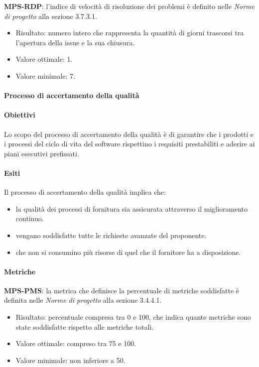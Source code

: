 \documentclass[../piano-di-qualifica.tex]{subfiles}
\begin{document}
\textbf{MPS-RDP}: l'indice di velocità di risoluzione dei problemi è definito nelle \textit{Norme di progetto} alla sezione 3.7.3.1.
\begin{itemize}
  \item Risultato: numero intero che rappresenta la quantità di giorni trascorsi tra l'apertura della issue e la sua chiusura.
  \item Valore ottimale: 1.
  \item Valore minimale: 7.
\end{itemize}

\paragraph{Processo di accertamento della qualità}%
\label{par:processo_di_accertamento_della_qualita}

\paragraph{Obiettivi}%
\label{par:obiettivi_accertamento_della_qualita}

Lo scopo del processo di accertamento della qualità è di garantire che i prodotti e i processi del ciclo di vita del software rispettino i requisiti prestabiliti e aderire ai piani esecutivi prefissati.

\paragraph{Esiti}%
\label{par:esiti}

Il processo di accertamento della qualità implica che:
\begin{itemize}
  \item la qualità dei processi di fornitura sia assicurata attraverso il miglioramento continuo.
  \item vengano soddisfatte tutte le richieste avanzate del proponente.
  \item che non si consumino più risorse di quel che il fornitore ha a disposizione.
\end{itemize}

\paragraph{Metriche}%
\label{par:metriche_prob}

\textbf{MPS-PMS}: la metrica che definisce la percentuale di metriche soddisfatte è definita nelle \textit{Norme di progetto} alla sezione 3.4.4.1.
\begin{itemize}
  \item Risultato: percentuale compresa tra 0 e 100, che indica quante metriche sono state soddisfatte rispetto alle metriche totali.
  \item Valore ottimale: compreso tra 75 e 100.
  \item Valore minimale: non inferiore a 50.
\end{itemize}
\end{document}
